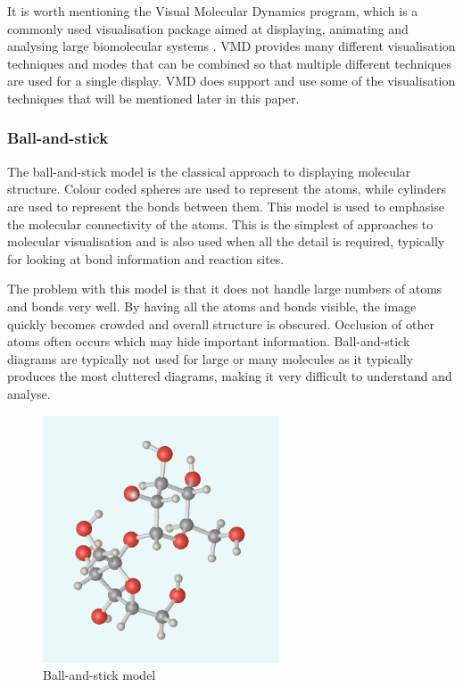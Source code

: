 It is worth mentioning the Visual Molecular Dynamics \citep{humphrey96} program,
which is a commonly used visualisation package aimed at displaying, animating
and analysing large biomolecular systems \citep{VMD}. VMD provides many
different visualisation techniques and modes that can be combined so that
multiple different techniques are used for a single display. VMD does support
and use some of the visualisation techniques that will be mentioned later in
this paper.

\subsubsection*{Ball-and-stick}
\label{ssub:ball_stick}

The ball-and-stick model is the classical approach to displaying molecular
structure. Colour coded spheres are used to represent the atoms, while cylinders
are used to represent the bonds between them. This model is used to emphasise
the molecular connectivity of the atoms. This is the simplest of approaches to
molecular visualisation and is also used when all the detail is required,
typically for looking at bond information and reaction sites.

The problem with this model is that it does not handle large numbers of atoms
and bonds very well. By having all the atoms and bonds visible, the image
quickly becomes crowded and overall structure is obscured. Occlusion of other
atoms often occurs which may hide important information. Ball-and-stick diagrams
are typically not used for large or many molecules as it typically produces the
most cluttered diagrams, making it very difficult to understand and analyse.

\begin{figure}[h!]
  \begin{center}
    \includegraphics[width=70mm]{BallStick}
  \end{center}
  \caption{Ball-and-stick model}
  \label{fig:ballstick}
\end{figure}

